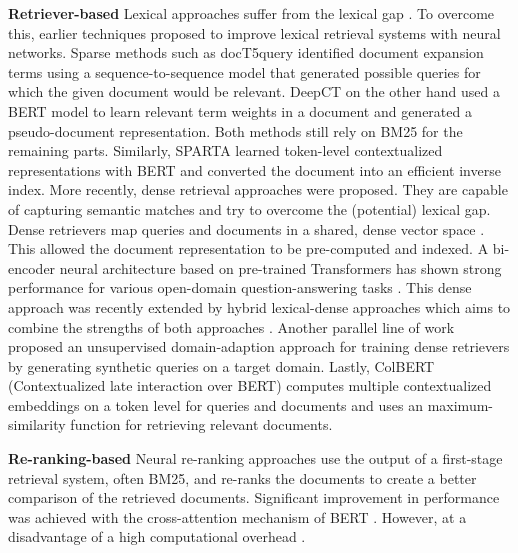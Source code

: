 \documentclass{article}
\begin{document}
\textbf{Retriever-based} \quad Lexical approaches suffer from the lexical gap \cite{berger2000bridging}. To overcome this, earlier techniques proposed to improve lexical retrieval systems with neural networks. Sparse methods such as docT5query \cite{nogueira2019document} identified document expansion terms using a sequence-to-sequence model that generated possible queries for which the given document would be relevant. DeepCT \cite{10.1145/3397271.3401204} on the other hand used a BERT \cite{devlin-etal-2019-bert} model to learn relevant term weights in a document and generated a pseudo-document representation. Both  methods still rely on BM25 for the remaining parts. Similarly, SPARTA \cite{zhao-etal-2021-sparta} learned token-level contextualized representations with BERT and converted the document into an efficient inverse index.  More recently, dense retrieval approaches were proposed. They are capable of capturing semantic matches and try to overcome the (potential) lexical gap. Dense retrievers map queries and documents in a shared, dense vector space \cite{gillick2018endtoend}. This allowed the document representation to be pre-computed and indexed. A bi-encoder neural architecture based on pre-trained Transformers has shown strong performance for various open-domain question-answering tasks  \cite{guo2020multireqa, karpukhin-etal-2020-dense, liang2020embeddingbased, ma2021zeroshot}. This dense approach was recently extended by hybrid lexical-dense approaches which aims to combine the strengths of both approaches \cite{gao2020complementing, seo-etal-2019-real, luan2021sparse}. Another parallel line of work proposed an unsupervised domain-adaption approach \cite{liang2020embeddingbased,ma2021zeroshot} for training dense retrievers by generating synthetic queries on a target domain. Lastly, ColBERT \cite{10.1145/3397271.3401075} (Contextualized late interaction over BERT) computes multiple contextualized embeddings on a token level for queries and documents and uses an maximum-similarity function for retrieving relevant documents.

\textbf{Re-ranking-based} \quad Neural re-ranking approaches use the output of a first-stage retrieval system, often BM25, and re-ranks the documents to create a better comparison of the retrieved documents. Significant improvement in performance was achieved with the cross-attention mechanism  of BERT \cite{nogueira2020passage}. However, at a disadvantage of a high computational overhead \cite{reimers-2019-sentence-bert}.

\vspace{-3mm}
\end{document}
